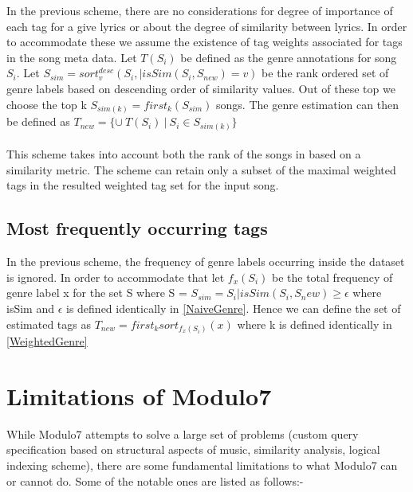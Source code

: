 \noindent In the previous scheme, there are no considerations for degree of importance of each tag for a give lyrics or about the degree of similarity between lyrics. In order to accommodate these we assume the existence of tag weights associated for tags in the song meta data. Let $T(S_i)$ be defined as the genre annotations for song $S_i$. Let $S_{sim} = sort_v^{desc}({S_i, | isSim(S_i, S_{new}) = v})$ be the rank ordered set of genre labels based on descending order of similarity values. Out of these top we choose the top k $S_{sim(k)} = first_{k} (S_{sim})$ songs. The genre estimation can then be defined as $T_{new} = \{\cup \ T(S_i) \ | \ S_i \in S_{sim(k)}\}$ \\\\
This scheme takes into account both the rank of the songs in based on a similarity metric. The scheme can retain only a subset of the maximal weighted tags in the resulted weighted tag set for the input song.

\subsection{Most frequently occurring tags} \label{MaxFrequencyGenre}

\noindent In the previous scheme, the frequency of genre labels occurring inside the dataset is ignored. In order to accommodate that let $f_x(S_i)$ be the total frequency of genre label x for the set S where S = $S_{sim} = {S_i | isSim(S_i, S_new) \geq \epsilon}$ where isSim and $\epsilon$ is defined identically in \ref{NaiveGenre}.  Hence we can define the set of estimated tags as $T_{new} = first_{k} sort_{f_x(S_i)}(x)$ where k is defined identically in \ref{WeightedGenre}

\section{Limitations of Modulo7} 

\noindent While Modulo7 attempts to solve a large set of problems (custom query specification based on structural aspects of music, similarity analysis, logical indexing scheme), there are some fundamental limitations to what Modulo7 can or cannot do. Some of the notable ones are listed as follows:-

